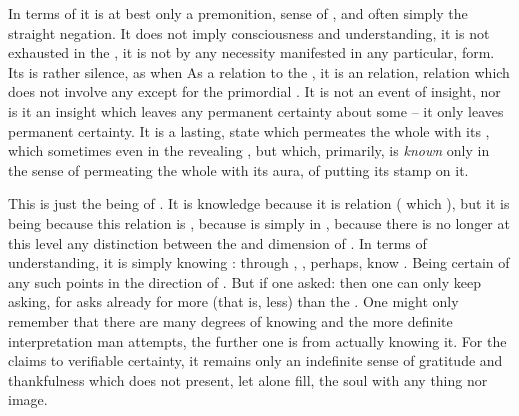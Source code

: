In terms of  it is at best only a  premonition,
 sense of , and often simply the straight
negation. 
It does not imply  consciousness and understanding, it is not
exhausted in the , it is not by any necessity manifested in any
particular,  form.  Its  is rather silence, as when
 As a relation to the
, it is an  relation, relation which does not involve
any  except for the primordial .
It is not an event of insight, nor is it an insight which leaves any permanent
certainty about some  -- it only leaves permanent certainty. It is a
lasting,  state which 
permeates the whole  with its , which sometimes even
 in the revealing , but which, primarily, is {\em
  known} only in the sense of permeating the whole  with its aura,
of putting its  stamp on it.


This  is just the being of
. It is knowledge because it is relation ( which
), but it is being because this relation is
, because  is simply  in
, because there is no longer at this level any distinction between the
 and  dimension of . 
In terms of  understanding, it is simply knowing
:    through , , perhaps,   know .
Being  
certain of any such  points in the direction of \Yes. But if one asked:
 then one can only keep asking, 
for  asks already for more (that is, less) than the . One might only remember that there are many degrees of knowing
 and the more definite interpretation man attempts, the further
one is from actually knowing it.  For the  claims to verifiable
certainty, it remains only an indefinite sense of gratitude and thankfulness 
which does not present, let alone fill, the soul with any thing nor image.

